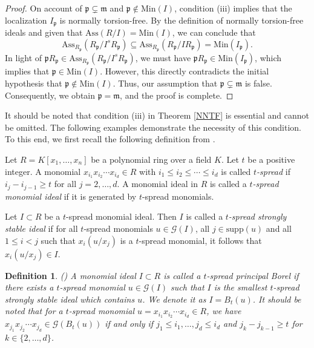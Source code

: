 \documentclass[11pt]{amsart}
\newtheorem{definition}[theorem]{Definition}
\begin{document}
\begin{proof}
  On account of  $\mathfrak{p} \subsetneq \mathfrak{m}$ and  $\mathfrak{p}\notin \mathrm{Min}(I)$, condition (iii) implies that the localization $I_{\mathfrak{p}}$ is
   normally torsion-free. By the definition of normally torsion-free ideals and given that $\mathrm{Ass}(R/I) = \mathrm{Min}(I)$, we can conclude that 
\[ \mathrm{Ass}_{R_{\mathfrak{p}}}(R_{\mathfrak{p}}/I^s R_{\mathfrak{p}}) \subseteq \mathrm{Ass}_{R_{\mathfrak{p}}}(R_{\mathfrak{p}}/I R_{\mathfrak{p}}) = \mathrm{Min}(I_{\mathfrak{p}}). \]
In light of $\mathfrak{p}R_{\mathfrak{p}} \in \mathrm{Ass}_{R_{\mathfrak{p}}}(R_{\mathfrak{p}}/I^s R_{\mathfrak{p}})$, 
 we must have $\mathfrak{p}R_{\mathfrak{p}} \in \mathrm{Min}(I_{\mathfrak{p}})$, which implies that $\mathfrak{p} \in \mathrm{Min}(I)$. However, this directly contradicts the initial hypothesis that $\mathfrak{p} \notin \mathrm{Min}(I)$. Thus, our assumption that $\mathfrak{p} \subsetneq \mathfrak{m}$
  is false. Consequently, we obtain  $\mathfrak{p} = \mathfrak{m}$, and the proof is complete.
\end{proof}

 

It should be noted that condition (iii) in Theorem  \ref{NNTF} is essential and cannot be omitted. The following examples demonstrate  the necessity of this condition.  To this end, we first recall the following definition  from \cite{NQKR}. 

\bigskip
 Let $R=K[x_1, \ldots, x_n]$ be a polynomial ring over a field $K$. Let $t$ be a positive integer. A monomial $x_{i_1} x_{i_2} \cdots x_{i_d} \in R$ with $i_1 \leq i_2 \leq \cdots  \leq i_d$ is called {\it $t$-spread} if $i_j -i_{j-1} \geq t$ for all $j=2, \ldots, d$.  A monomial ideal in $R$ is called a {\it $t$-spread monomial ideal} if it is generated by $t$-spread monomials.   

Let $I\subset R$ be a $t$-spread monomial ideal. Then $I$ is called a {\it $t$-spread strongly stable ideal} if for all $t$-spread monomials $u\in \mathcal{G}(I)$, all $j\in \mathrm{supp}(u)$
 and all $1\leq i <j$ such that $x_i(u/x_j)$  is a $t$-spread monomial, it follows that $x_i(u/x_j)\in I$. 
 
 \begin{definition}(\cite[Definition 5.1]{NQKR})
 A monomial ideal $I\subset R$ is called a {\it $t$-spread principal Borel} if there exists a $t$-spread monomial $u\in \mathcal{G}(I)$ such that  $I$  is the smallest $t$-spread strongly stable ideal which contains $u$. We denote it as $I=B_t(u)$. It should be noted that for a $t$-spread monomial $u=x_{i_1} x_{i_2} \cdots x_{i_d} \in R$, we have $x_{j_1} x_{j_2} \cdots x_{j_d}\in \mathcal{G}(B_t(u))$ if and only if 
 $j_1\leq i_1, \ldots, j_d \leq i_d$ and $j_k - j_{k-1} \geq t$ for $k\in \{2, \ldots, d\}$.  
 \end{definition}
 
\end{document}
